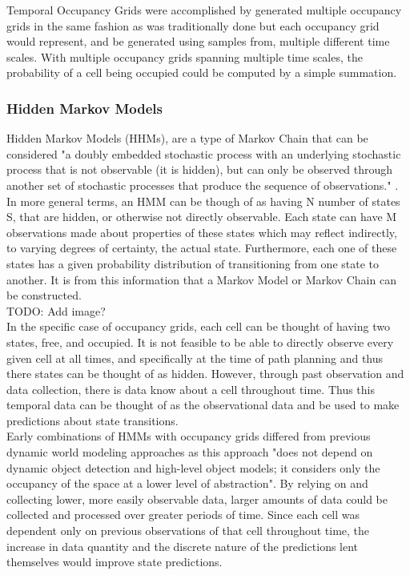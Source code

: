 Temporal Occupancy Grids were accomplished by generated multiple occupancy
grids in the same fashion as was traditionally done but each occupancy grid
would represent, and be generated using samples from, multiple different time
scales. With multiple occupancy grids spanning multiple time scales, the
probability of a cell being occupied could be computed by a simple summation.

\subsubsection{ Hidden Markov Models }

Hidden Markov Models (HHMs), are a type of Markov Chain that can be considered
"a doubly embedded stochastic process with an underlying stochastic process
that is not observable (it is hidden), but can only be observed through
another set of stochastic processes that produce the sequence of observations."
\cite{Rabiner1989}. In more general terms, an HMM can be though of as having N
number of states S, that are hidden, or otherwise not directly observable.
Each state can have M observations made about properties of these states which
may reflect indirectly, to varying degrees of certainty, the actual state.
Furthermore, each one of these states has a given probability distribution of
transitioning from one state to another. It is from this information that a
Markov Model or Markov Chain can be constructed. \\

TODO: Add image? \\

In the specific case of occupancy grids, each cell can be thought of having two
states, free, and occupied. It is not feasible to be able to directly observe
every given cell at all times, and specifically at the time of path planning
and thus there states can be thought of as hidden. However, through past
observation and data collection, there is data know about a cell throughout
time. Thus this temporal data can be thought of as the observational data and
be used to make predictions about state transitions. \\

Early combinations of HMMs with occupancy grids differed from previous dynamic
world modeling approaches as this approach "does not depend on dynamic object
detection and high-level object models; it considers only the occupancy of the
space at a lower level of abstraction"\cite{Meyer-Delius2012}. By relying on
and collecting lower, more easily observable data, larger amounts of data could
be collected and processed over greater periods of time. Since each cell was
dependent only on previous observations of that cell throughout time, the
increase in data quantity and the discrete nature of the predictions lent
themselves would improve state predictions. \\

